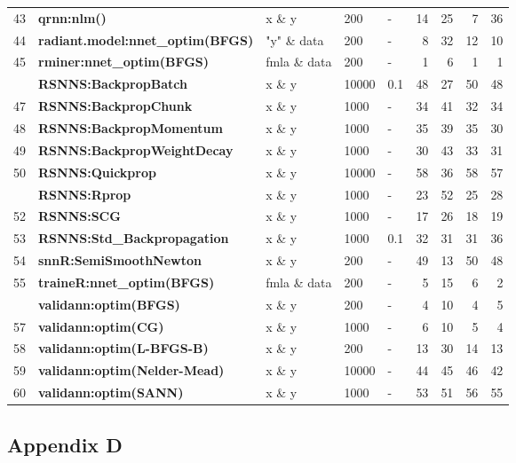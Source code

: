 \begin{Schunk}
\begin{table}
\begin{tabular}[t]{r>{\bfseries}llllrrrr}
43 & qrnn:nlm() & x \& y & 200 & - & 14 & 25 & 7 & 36\\
44 & radiant.model:nnet\_optim(BFGS) & "y" \& data & 200 & - & 8 & 32 & 12 & 10\\
45 & rminer:nnet\_optim(BFGS) & fmla \& data & 200 & - & 1 & 6 & 1 & 1\\
\addlinespace
46 & RSNNS:BackpropBatch & x \& y & 10000 & 0.1 & 48 & 27 & 50 & 48\\
47 & RSNNS:BackpropChunk & x \& y & 1000 & - & 34 & 41 & 32 & 34\\
48 & RSNNS:BackpropMomentum & x \& y & 1000 & - & 35 & 39 & 35 & 30\\
49 & RSNNS:BackpropWeightDecay & x \& y & 1000 & - & 30 & 43 & 33 & 31\\
50 & RSNNS:Quickprop & x \& y & 10000 & - & 58 & 36 & 58 & 57\\
\addlinespace
51 & RSNNS:Rprop & x \& y & 1000 & - & 23 & 52 & 25 & 28\\
52 & RSNNS:SCG & x \& y & 1000 & - & 17 & 26 & 18 & 19\\
53 & RSNNS:Std\_Backpropagation & x \& y & 1000 & 0.1 & 32 & 31 & 31 & 36\\
54 & snnR:SemiSmoothNewton & x \& y & 200 & - & 49 & 13 & 50 & 48\\
55 & traineR:nnet\_optim(BFGS) & fmla \& data & 200 & - & 5 & 15 & 6 & 2\\
\addlinespace
56 & validann:optim(BFGS) & x \& y & 200 & - & 4 & 10 & 4 & 5\\
57 & validann:optim(CG) & x \& y & 1000 & - & 6 & 10 & 5 & 4\\
58 & validann:optim(L-BFGS-B) & x \& y & 200 & - & 13 & 30 & 14 & 13\\
59 & validann:optim(Nelder-Mead) & x \& y & 10000 & - & 44 & 45 & 46 & 42\\
60 & validann:optim(SANN) & x \& y & 1000 & - & 53 & 51 & 56 & 55\\
\bottomrule
\end{tabular}
\end{table}

\end{Schunk}

\hypertarget{appendix-d}{%
\subsection{Appendix D}\label{appendix-d}}

